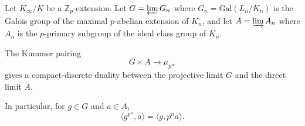 Let $K_{\infty}/K$ be a $\mathbb{Z}_p$-extension. Let $G = \varprojlim G_n$ where $G_n = \text{Gal}(L_n/K_n)$ is the Galois group of the maximal $p$-abelian extension of $K_n$, and let $A = \varinjlim A_n$ where $A_n$ is the $p$-primary subgroup of the ideal class group of $K_n$.

The Kummer pairing
$$G \times A \longrightarrow \mu_{p^{\infty}}$$
gives a compact-discrete duality between the projective limit $G$ and the direct limit $A$.

In particular, for $g \in G$ and $a \in A$,
$$\langle g^{p^n}, a \rangle = \langle g, p^n a \rangle.$$
